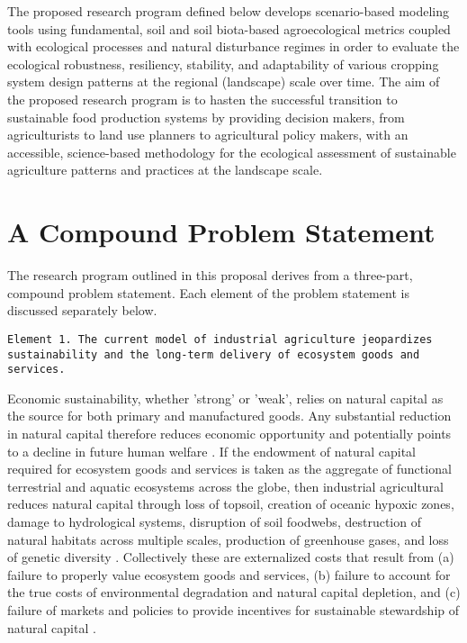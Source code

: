 \documentclass[twoside]{article}	%
\begin{document}
The proposed research program defined below develops scenario-based modeling tools using fundamental, soil and soil biota-based agroecological metrics coupled with ecological processes and natural disturbance regimes in order to evaluate the ecological robustness, resiliency, stability, and adaptability of various cropping system design patterns at the regional (landscape) scale over time. The aim of the proposed research program is to hasten the successful transition to sustainable food production systems by providing decision makers, from agriculturists to land use planners to agricultural policy makers, with an accessible, science-based methodology for the ecological assessment of sustainable agriculture patterns and practices at the landscape scale.  




\section{A Compound Problem Statement}
The research program outlined in this proposal derives from a three-part, compound problem statement. Each element of the problem statement is discussed separately below.\\ 

\begin{sloppypar}
\texttt{Element 1. The current model of industrial agriculture jeopardizes sustainability and the long-term delivery of ecosystem goods and services.}\\
\end{sloppypar}


Economic sustainability, whether 'strong' or 'weak', relies on natural capital as the source for both primary and manufactured goods. Any substantial reduction in natural capital therefore reduces economic opportunity and potentially points to a decline in future human welfare \citep{pearce_blueprint_2000}. If the endowment of natural capital required for ecosystem goods and services is taken as the aggregate of functional terrestrial and aquatic ecosystems across the globe, then industrial agricultural reduces natural capital through loss of topsoil, creation of oceanic hypoxic zones, damage to hydrological systems, disruption of soil foodwebs, destruction of natural habitats across multiple scales, production of greenhouse gases, and loss of genetic diversity \citep{gliessman_agroecology:_2015}. Collectively these are externalized costs that result from (a) failure to properly value ecosystem goods and services, (b) failure to account for the true costs of environmental degradation and natural capital depletion, and (c) failure of markets and policies to provide incentives for sustainable stewardship of natural capital \citep{pearce_blueprint_2000}. \\
\end{document}
